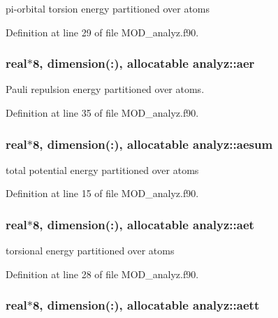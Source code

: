pi-\/orbital torsion energy partitioned over atoms 



Definition at line 29 of file M\-O\-D\-\_\-analyz.\-f90.

\hypertarget{classanalyz_ada8f360240cfe9f57065425084d05f4f}{
\subsubsection[{aer}]{\setlength{\rightskip}{0pt plus 5cm}real$\ast$8, dimension(\-:), allocatable analyz\-::aer}}\label{classanalyz_ada8f360240cfe9f57065425084d05f4f}


Pauli repulsion energy partitioned over atoms. 



Definition at line 35 of file M\-O\-D\-\_\-analyz.\-f90.

\hypertarget{classanalyz_ad018e9bf5a6ab57c2b6f25028947cbee}{
\subsubsection[{aesum}]{\setlength{\rightskip}{0pt plus 5cm}real$\ast$8, dimension(\-:), allocatable analyz\-::aesum}}\label{classanalyz_ad018e9bf5a6ab57c2b6f25028947cbee}


total potential energy partitioned over atoms 



Definition at line 15 of file M\-O\-D\-\_\-analyz.\-f90.

\hypertarget{classanalyz_a7083d5d6229520f4ce5208e5391a586e}{
\subsubsection[{aet}]{\setlength{\rightskip}{0pt plus 5cm}real$\ast$8, dimension(\-:), allocatable analyz\-::aet}}\label{classanalyz_a7083d5d6229520f4ce5208e5391a586e}


torsional energy partitioned over atoms 



Definition at line 28 of file M\-O\-D\-\_\-analyz.\-f90.

\hypertarget{classanalyz_aca08ee87eb6dd9428985460060eeef30}{
\subsubsection[{aett}]{\setlength{\rightskip}{0pt plus 5cm}real$\ast$8, dimension(\-:), allocatable analyz\-::aett}}\label{classanalyz_aca08ee87eb6dd9428985460060eeef30}


